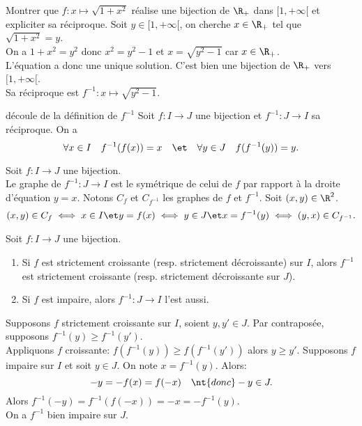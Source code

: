 \documentclass[11pt]{article}
\begin{document}
\begin{ex}{}{}
    Montrer que $f:x\mapsto\sqrt{1+x^2}$ réalise une bijection de $\R_+$ dans $[1,+\infty[$ et expliciter sa réciproque.
    \tcblower
    Soit $y\in[1,+\infty[$, on cherche $x\in\R_+$ tel que $\sqrt{1+x^2}=y$.\\
    On a $1+x^2=y^2$ donc $x^2=y^2-1$ et $x=\sqrt{y^2-1}$ car $x\in\R_+$.\\
    L'équation a donc une unique solution. C'est bien une bijection de $\R_+$ vers $[1,+\infty[$.\\
    Sa réciproque est $f^{-1}:x\mapsto\sqrt{y^2-1}$.
\end{ex}

\begin{prop}{découle de la définition de $f^{-1}$}{}
    Soit $f:I\to J$ une bijection et $f^{-1}:J\to I$ sa réciproque. On a
    \begin{equation*}
        \forall x\in I\quad f^{-1}(f(x))=x\quad\et\quad\forall y\in J\quad f(f^{-1}(y))=y.
    \end{equation*}
\end{prop}

\begin{prop}{}{}
    Soit $f:I\to J$ une bijection.\\
    Le graphe de $f^{-1}:J\to I$ est le symétrique de celui de $f$ par rapport à la droite d'équation $y=x$.
    \tcblower
    Notons $C_f$ et $C_{f^{-1}}$ les graphes de $f$ et $f^{-1}$. Soit $(x,y)\in \R^2$.
    \begin{equation*}
        (x,y)\in C_f \iff x\in I\et y=f(x)\iff y\in J\et x=f^{-1}(y) \iff (y,x)\in C_{f^{-1}}.
    \end{equation*}
\end{prop}

\begin{prop}{}{}
    Soit $f:I\to J$ une bijection.
    \begin{enumerate}
        \item Si $f$ est strictement croissante (resp. strictement décroissante) sur $I$, alors $f^{-1}$ est strictement croissante (resp. strictement décroissante sur $J$).
        \item Si $f$ est impaire, alors $f^{-1}:J\to I$ l'est aussi.
    \end{enumerate}
    \tcblower
     Supposons $f$ strictement croissante sur $I$, soient $y,y'\in J$. Par contraposée, supposons $f^{-1}(y)\geq f^{-1}(y')$.\\
    Appliquons $f$ croissante: $f(f^{-1}(y))\geq f(f^{-1}(y'))$ alors $y\geq y'$.\n
     Supposons $f$ impaire sur $I$ et soit $y\in J$. On note $x=f^{-1}(y)$. Alors:
    \begin{equation*}
        -y=-f(x)=f(-x)\quad\nt{donc }-y\in J.
    \end{equation*}
    Alors $f^{-1}(-y)=f^{-1}(f(-x))=-x=-f^{-1}(y)$.\\
    On a $f^{-1}$ bien impaire sur $J$.
\end{prop}
\end{document}
